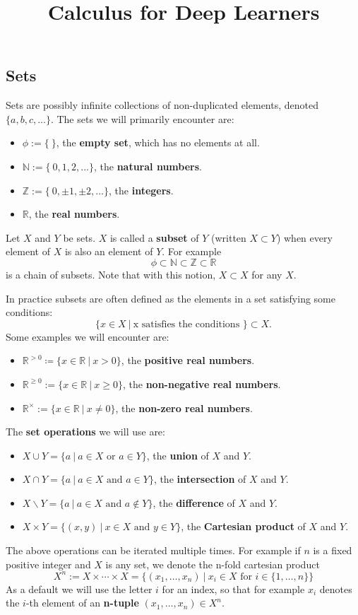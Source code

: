 \documentclass[12pt]{amsart}
\numberwithin{equation}{section}
\newcommand\Rb{{\mathbb R}} %
\newcommand\Zb{{\mathbb Z}} %
\newcommand\Nb{{\mathbb N}} %
\newcommand{\pipe}{\:|\:}
\begin{document}
\title{Calculus for Deep Learners}
\maketitle


\subsection{Sets}\label{S:Sets}
Sets are possibly infinite collections of non-duplicated elements, denoted $\{a,b,c,...\}$.  The sets we will primarily encounter are:
\begin{itemize}
 \item $\phi := \{\:\}$, the \textbf{empty set}, which has no elements at all.
 \item $\Nb := \{\:0,1,2,...\}$, the \textbf{natural numbers}.
 \item $\Zb := \{\:0,\pm 1, \pm 2,...\}$, the \textbf{integers}.
 \item $\Rb$, the \textbf{real numbers}.
\end{itemize}
Let $X$ and $Y$ be sets.  $X$ is called a \textbf{subset} of $Y$ (written $X\subset Y$) when every element of $X$ is also an element of $Y$.  For example 
$$\phi\subset\Nb\subset\Zb\subset\Rb$$ 
is a chain of subsets.  Note that with this notion, $X\subset X$ for any $X$.

In practice subsets are often defined as the elements in a set satisfying some conditions:
$$ \{x\in X \pipe \text{x satisfies the conditions } \} \subset X. $$
Some examples we will encounter are:
\begin{itemize}
 \item $\Rb^{>0} \coloneqq \{ x\in \Rb \pipe x>0 \}$, the \textbf{positive real numbers}.
 \item $\Rb^{\geq 0} := \{ x\in \Rb \pipe x\geq 0 \}$, the \textbf{non-negative real numbers}.
 \item $\Rb^{\times} := \{ x\in \Rb \pipe x\neq 0 \}$, the \textbf{non-zero real numbers}.
\end{itemize}
The \textbf{set operations} we will use are:
\begin{itemize}
 \item $X \cup Y = \{ a \pipe a\in X \text{ or } a\in Y\}$, the \textbf{union} of $X$ and $Y$.
 \item $X \cap Y = \{ a \pipe a\in X \text{ and } a\in Y\}$, the \textbf{intersection} of $X$ and $Y$.
 \item $X \backslash Y = \{ a \pipe a\in X \text{ and } a\notin Y\}$, the \textbf{difference} of $X$ and $Y$.
 \item $X \times Y = \{ (x,y) \pipe x\in X \text{ and } y\in Y\}$, the \textbf{Cartesian product} of $X$ and $Y$.
\end{itemize}
The above operations can be iterated multiple times.  For example if $n$ is a fixed positive integer and $X$ is any set, we denote the n-fold cartesian product
  $$X^n := X\times \cdots \times X = \{(x_1,\dots,x_n)\pipe x_i\in X \text{ for } i\in \{1,\dots,n\}\}$$
 As a default we will use the letter $i$ for an index, so that for example $x_i$ denotes the $i$-th element of an \textbf{n-tuple} $(x_1,\dots,x_n)\in X^n$.
\end{document}
